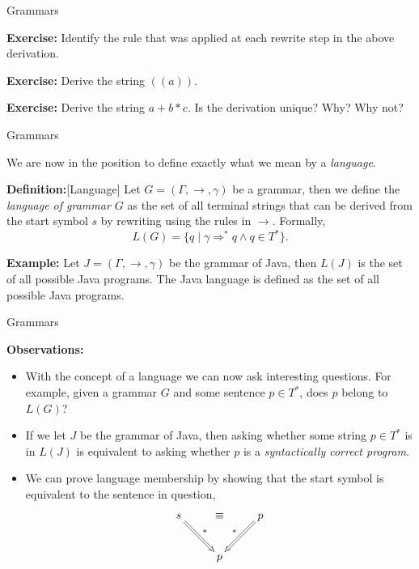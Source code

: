 \documentclass{beamer}
\begin{document}
\begin{frame}[fragile]{Grammars}

{\bf Exercise:} Identify the rule that was applied at each rewrite step in the above derivation.

{\bf Exercise:} Derive the string $((a))$.

{\bf Exercise:} Derive the string $a + b * c$.  Is the derivation unique?  Why? Why not?

\end{frame}

\begin{frame}[fragile]{Grammars}

\small
We are now in the position to define exactly what we mean by a {\em language}.

\vspace{.2in}
{\bf Definition:}[Language] Let $G = (\Gamma,\rightarrow,\gamma)$ be a grammar, then we define the {\em language of
grammar $G$} as the set of all terminal strings that can be derived from the start symbol $s$ by rewriting
using the rules in $\rightarrow$.  Formally,
\[
L(G) = \{ q \mid \gamma \Rightarrow^* q \wedge q\in T^*\}.
\]

\vspace{.3in}
{\bf Example:} Let $J = (\Gamma,\rightarrow,\gamma)$ be the grammar of Java, then $L(J)$ is the set of all possible Java
programs.  The Java language is defined as the set of all possible Java programs.
\end{frame}


\begin{frame}[fragile]{Grammars}

\small
{\bf Observations:}
\begin{itemize}
\item With the concept of a language we can now ask interesting questions.  For example,
given a grammar $G$ and some sentence $p\in T^*$, does $p$ belong to $L(G)$?
\item If we let $J$ be the grammar of Java, then asking whether some string $p\in T^*$ is in $L(J)$
is equivalent to asking whether $p$ is a {\em syntactically correct program}.
\item We can prove language membership by showing that the start symbol is equivalent to the
sentence in question,
{\scriptsize
\[
\xymatrix{
s \ar@{=>}[rd]^{*} &\equiv &p\ar@{=>}[ld]_{*}  \\
&p&
}
\]
}

\end{itemize}

\end{frame}
\end{document}
